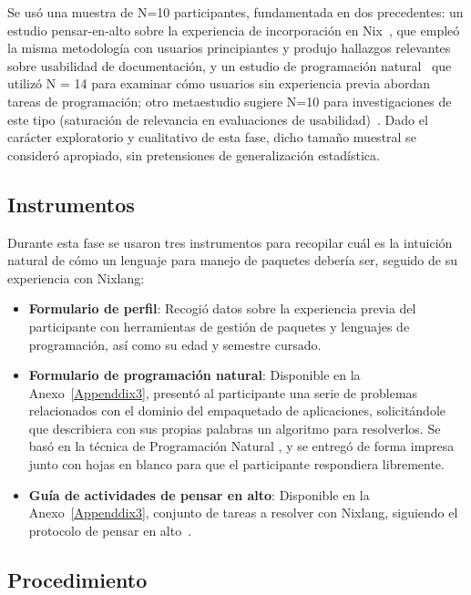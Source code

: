 Se usó una muestra de N=10 participantes, fundamentada en dos precedentes: un estudio pensar-en-alto sobre la experiencia de incorporación en Nix~\cite{fricklerhandwerk2022}, que empleó la misma metodología con usuarios principiantes y produjo hallazgos relevantes sobre usabilidad de documentación, y un estudio de programación natural~\cite{paneStudyingLanguageStructure2001} que utilizó N = 14 para examinar cómo usuarios sin experiencia previa abordan tareas de programación; otro metaestudio sugiere N=10 para investigaciones de este tipo (saturación de relevancia en evaluaciones de usabilidad)~\cite{wutichSampleSizes102024}. Dado el carácter exploratorio y cualitativo de esta fase, dicho tamaño muestral se consideró apropiado, sin pretensiones de generalización estadística.

\subsection{Instrumentos}

Durante esta fase se usaron tres instrumentos para recopilar cuál es la intuición natural de cómo un lenguaje para manejo de paquetes debería ser, seguido de su experiencia con Nixlang:

\begin{itemize}
\item \textbf{Formulario de perfil}: Recogió datos sobre la experiencia previa del
participante con herramientas de gestión de paquetes y lenguajes de
programación, así como su edad y semestre cursado.
\item \textbf{Formulario de programación natural}: Disponible en la Anexo~\ref{Appenddix3}, presentó al participante una serie de
problemas relacionados con el dominio del empaquetado de aplicaciones,
solicitándole que describiera con sus propias palabras un algoritmo para
resolverlos. Se basó en la técnica de Programación Natural
\cite{panePDFMoreNatural2006}, y se entregó de forma impresa junto con hojas en
blanco para que el participante respondiera libremente.
\item \textbf{Guía de actividades de pensar en alto}: Disponible en la Anexo~\ref{Appenddix3}, conjunto de tareas a resolver con
Nixlang, siguiendo el protocolo de pensar en alto~\cite{PDFThinkAloud}.
\end{itemize}

\subsection{Procedimiento}

